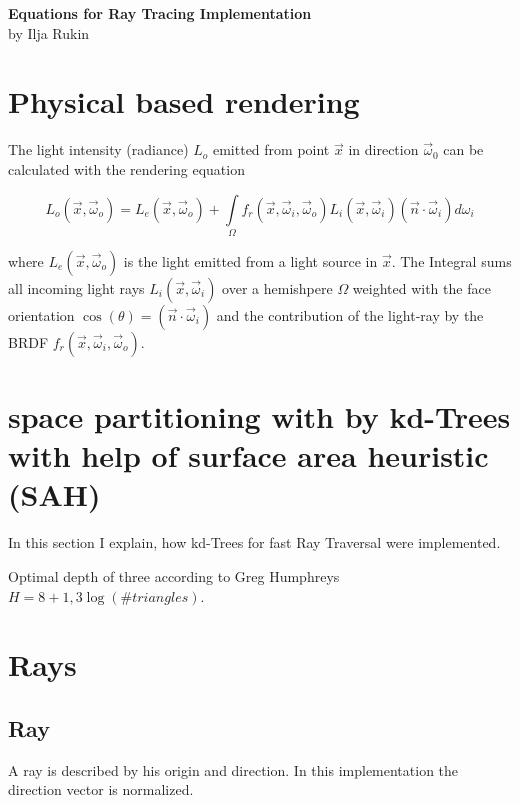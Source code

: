 \documentclass[11pt,a4paper,oneside]{article}
\begin{document}
\begin{center}
{\Large\bfseries Equations for Ray Tracing Implementation} \\


by Ilja Rukin
\thispagestyle{empty}
\end{center}

\newpage
\setcounter{page}{1}

\section{Physical based rendering}

The light intensity (radiance) $L_o$ emitted from point $\vec{x}$ in direction $\vec{\omega}_0$ can be calculated with the rendering equation

\begin{equation}
L_o(\vec{x},\vec{\omega}_o) = L_e(\vec{x},\vec{\omega}_o) + \int\limits_{\Omega} f_r(\vec{x},\vec{\omega}_i,\vec{\omega}_o) L_i(\vec{x},\vec{\omega}_i) ( \vec{n} \cdot \vec{\omega}_i ) d\omega_i
\end{equation}

where $L_e(\vec{x},\vec{\omega}_o)$ is the light emitted from a light source in $\vec{x}$. The Integral sums all incoming light rays $L_i(\vec{x},\vec{\omega}_i)$ over a hemishpere $\Omega$ weighted with the face orientation $\cos(\theta) = ( \vec{n} \cdot \vec{\omega}_i )$ and the contribution of the light-ray by the BRDF $f_r(\vec{x},\vec{\omega}_i,\vec{\omega}_o)$.

\section{space partitioning with by kd-Trees with help of surface area heuristic (SAH)}
In this section I explain, how kd-Trees for fast Ray Traversal were implemented. 


Optimal depth of three according to Greg Humphreys $H = 8 + 1,3 \log(\#triangles)$.



\section{Rays}

\subsection{Ray}
A ray is described by his origin and direction. In this implementation the direction vector is normalized.
\end{document}
